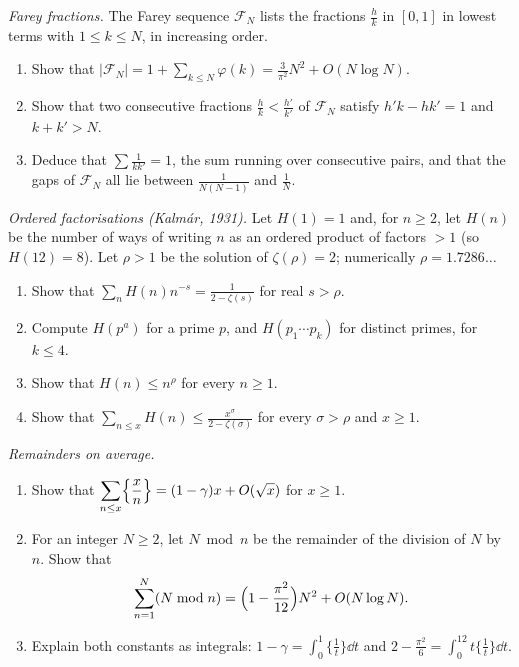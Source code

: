 \begin{exercise}[$\star\star$]\label{pb:farey}
\emph{Farey fractions.} The Farey sequence $\mathcal F_N$ lists the fractions $\frac hk$ in $[0,1]$ in lowest terms with $1\le k\le N$,
in increasing order.
\begin{enumerate}[label=(\alph*)]
\item Show that $|\mathcal F_N|=1+\sum_{k\le N}\varphi(k)=\frac3{\pi^2}N^2+O(N\log N)$.
\item Show that two consecutive fractions $\frac hk<\frac{h'}{k'}$ of $\mathcal F_N$ satisfy $h'k-hk'=1$ and $k+k'>N$.
\item Deduce that $\sum\frac1{kk'}=1$, the sum running over consecutive pairs, and that the gaps of $\mathcal F_N$ all lie between
$\frac1{N(N-1)}$ and $\frac1N$.
\end{enumerate}
\end{exercise}

\begin{exercise}[$\star\star$]\label{pb:orderedfact}
\emph{Ordered factorisations (Kalmár, 1931).} Let $H(1)=1$ and, for $n\ge2$, let $H(n)$ be the number of ways of writing $n$ as an
ordered product of factors $>1$ (so $H(12)=8$). Let $\rho>1$ be the solution of $\zeta(\rho)=2$; numerically $\rho=1.7286\ldots$
\begin{enumerate}[label=(\alph*)]
\item Show that $\sum_nH(n)n^{-s}=\frac1{2-\zeta(s)}$ for real $s>\rho$.
\item Compute $H(p^a)$ for a prime $p$, and $H(p_1\cdots p_k)$ for distinct primes, for $k\le4$.
\item Show that $H(n)\le n^\rho$ for every $n\ge1$.
\item Show that $\sum_{n\le x}H(n)\le\frac{x^\sigma}{2-\zeta(\sigma)}$ for every $\sigma>\rho$ and $x\ge1$.
\end{enumerate}
\end{exercise}

\begin{exercise}[$\star\star$]\label{pb:fracmean}
\emph{Remainders on average.}
\begin{enumerate}[label=(\alph*)]
\item Show that $\displaystyle\sum_{n\le x}\Bigl\{\frac xn\Bigr\}=(1-\gamma)x+O(\sqrt x)$ for $x\ge1$.
\item For an integer $N\ge2$, let $N\bmod n$ be the remainder of the division of $N$ by $n$. Show that
\[
\sum_{n=1}^N(N\bmod n)=\Bigl(1-\frac{\pi^2}{12}\Bigr)N^2+O(N\log N).
\]
\item Explain both constants as integrals: $1-\gamma=\int_0^1\{\frac1t\}\dd t$ and $2-\frac{\pi^2}6=\int_0^12t\{\frac1t\}\dd t$.
\end{enumerate}
\end{exercise}

